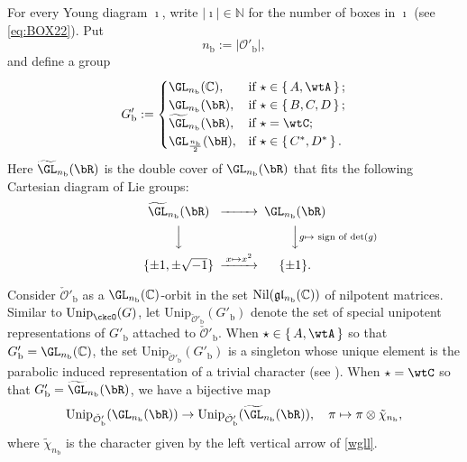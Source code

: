 \documentclass[11pt,a4paper]{amsart}
\def\abs#1{\left|{#1}\right|}
\newcommand{\BN}{{\mathbb {N}}}
\newcommand{\CO}{{\mathcal {O}}}
\newcommand{\gl}{\mathfrak g \mathfrak l}
\numberwithin{equation}{section}
\theoremstyle{remark}
\def\Unip{\mathrm{Unip}}
\begin{document}
 For every Young diagram $\imath$, write $\abs{\imath}\in \BN$ for the number of boxes in $\imath$ (see \eqref{eq:BOX22}). Put
 \[
   n_\mathrm b:=\abs{\CO'_\mathrm b},
 \]
 and define a group
 \begin{equation}\label{Gpb}
  G'_\mathrm b := \begin{cases}
  \GL_{n_\mathrm b}(\C),  & \text{if } \star \in \set{A, \wtA}; \\
    \GL_{n_\mathrm b}(\bR), & \text{if } \star \in \set{B,C,D}; \\
       \widetilde{ \GL}_{n_\mathrm b}(\bR), & \text{if } \star =\wtC; \\
    \GL_{\frac{n_\mathrm b}{2}}(\bH), & \text{if } \star \in \set{C^{*},D^{*}}. \\
  \end{cases}
\end{equation}
Here $ \widetilde{ \GL}_{n_\mathrm b}(\bR)$ is the double cover of $ \GL_{n_\mathrm b}(\bR)$ that fits the following Cartesian diagram of Lie groups:
\begin{equation}\label{wgll}
\begin{CD}
 \widetilde{ \GL}_{n_\mathrm b}(\bR)@>>>  \GL_{n_\mathrm b}(\bR)\\
  @VVV @VV g\mapsto \textrm{ sign of $\det(g)$} V\\
  \{\pm 1, \pm \sqrt{-1}\} @> x\mapsto x^2 >> \{\pm 1\}. \\
\end{CD}
\end{equation}

Consider $\check \CO'_\mathrm b$ as a $\GL_{n_\mathrm b}(\C)$-orbit in the set $\mathrm{Nil}(\gl_{n_\mathrm b}(\C))$ of nilpotent matrices. Similar to $\Unip_{\ckcO}(G)$,  let $\Unip_{\check \CO'_\mathrm b}(G'_\mathrm b)$ denote the set of special unipotent representations of $G'_\mathrm b$ attached to $\check \CO'_\mathrm b$. When $\star \in \set{A, \wtA}$ so that $G'_\mathrm b=\GL_{n_\mathrm b}(\C)$, the set  $\Unip_{\check \CO'_\mathrm b}(G'_\mathrm b)$ is a singleton whose  unique element is the parabolic induced representation of a trivial character (see \cite[Section 2.9]{BMSZa}). When $\star=\wtC$ so that $G'_\mathrm b= \widetilde{ \GL}_{n_\mathrm b}(\bR)$, we have a  bijective map
 \[
    \Unip_{\check \CO'_\mathrm b}(\GL_{n_\mathrm b}(\bR))\rightarrow  \Unip_{\check \CO'_\mathrm b}(\widetilde{ \GL}_{n_\mathrm b}(\bR)), \quad \pi\mapsto \pi\otimes \tilde \chi_{n_\mathrm b},
 \]
 where $\tilde \chi_{n_\mathrm b}$ is the character given by the left vertical arrow of \eqref{wgll}.
\end{document}
